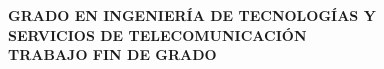 \pagestyle{empty}

\vspace*{5.5cm}

\begin{center}
    {\Large\rm \textbf{ GRADO EN INGENIERÍA DE TECNOLOGÍAS Y\\
    SERVICIOS DE TELECOMUNICACIÓN\\}}
    \vspace{2.0cm}
    {\Large\rm \textbf{TRABAJO FIN DE GRADO}} \\
    \vspace{4cm}
    {\Large\rm\textbf{\MakeUppercase{\tfgtitle}}}
    \vfill
    {\Large\rm\textbf{\MakeUppercase{\authorname}}} \\
    {\Large \textbf{\MakeUppercase{\fecha}}}
    \vspace{1.0cm}
\end{center}

